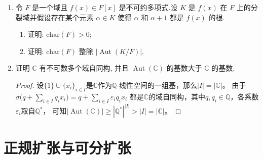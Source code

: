 \begin{enumerate}
\item 令 $F$ 是一个域且 $f(x) \in F[x]$ 是不可约多项式.设 $K$ 是 $f(x)$ 在 $F$ 上的分裂域并假设存在某个元素 $\alpha \in K$ 使得 $\alpha$ 和 $\alpha + 1$ 都是 $f(x)$ 的根.
\begin{enumerate}[label=(\arabic*)]
\item 证明: $\text{char}(F) > 0$;
\item 证明: $\text{char}(F)$ 整除 $|\operatorname{Aut}(K/F)|$.
\end{enumerate}

\item 证明 $\mathbb{C}$ 有不可数多个域自同构, 并且 $\operatorname{Aut}(\mathbb{C})$ 的基数大于 $\mathbb{C}$ 的基数.
\begin{proof}
    设$\{1\}\cup\{x_i\}_{i \in I}$是$\mathbb{C}$作为$\mathbb{Q}$-线性空间的一组基，那么$|I|=|\mathbb{C}|$。
    由于$\sigma\Big(q+\sum\limits_{i \in I}q_ix_i\Big)=q+\sum\limits_{i \in I}\varepsilon_iq_ix_i$
    都是$\mathbb{C}$的域自同构，其中$q,q_i\in\mathbb{Q}$，各系数$\varepsilon_i$取自$\mathbb{Q}^*$，
    可知$|\operatorname{Aut}(\mathbb{C})|\geqslant|\mathbb{Q}^*|^{|I|}>|I|=|\mathbb{C}|$。
\end{proof}
\end{enumerate}

\section{正规扩张与可分扩张}


